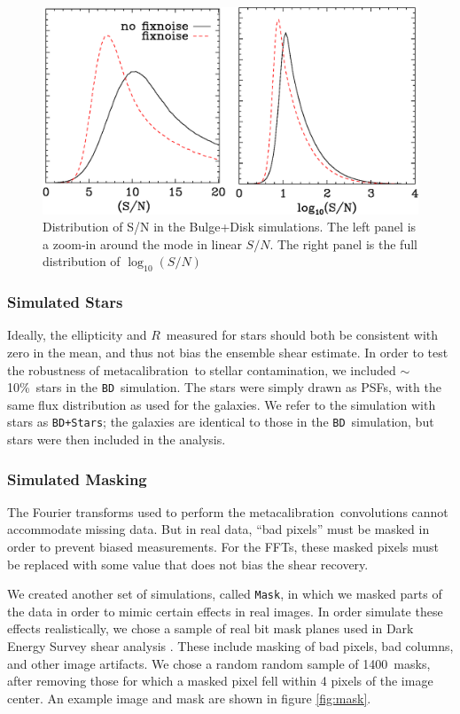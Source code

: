 \documentclass[usegraphicx,usenatbib]{mn2e}
\newcommand{\nmasks}{1400}
\newcommand{\mcal}{metacalibration}
\newcommand{\mcalR}{$R$}
\newcommand{\nsimNstarperc}{10\%}
\newcommand{\bdsim}{\texttt{BD}}
\newcommand{\bdstar}{\texttt{BD+Stars}}
\newcommand{\bdmask}{\texttt{Mask}}
\begin{document}
\begin{figure}
    \centering
    \includegraphics[scale=0.45]{s2n-bd36.eps}

    \caption{Distribution of S/N in the Bulge+Disk simulations. The
    left panel is a zoom-in around the mode in linear $S/N$.  The right panel is
the full distribution of $\log_{10}(S/N)$}

\label{fig:s2n}
\end{figure}

\subsubsection{Simulated Stars}

Ideally, the ellipticity and \mcalR\ measured for stars should both be
consistent with zero in the mean, and thus not bias the ensemble shear
estimate.  In order to test the robustness of \mcal\ to stellar contamination,
we included $\sim$\nsimNstarperc\ stars in the \bdsim\ simulation.  The stars
were simply drawn as PSFs, with the same flux distribution as used for the
galaxies.  We refer to the simulation with stars as \bdstar; the
galaxies are identical to those in the \bdsim\ simulation, but stars
were then included in the analysis.

\subsubsection{Simulated Masking}

The Fourier transforms used to perform the \mcal\ convolutions cannot
accommodate missing data.  But in real data, ``bad pixels'' must be masked in
order to prevent biased measurements. For the FFTs, these masked pixels must be
replaced with some value that does not bias the shear recovery.

We created another set of simulations, called \bdmask, in which we masked
parts of the data in order to mimic certain effects in real images.  In order
simulate these effects realistically, we chose a sample of real bit mask planes
used in Dark Energy Survey shear analysis \citep{DESSVShear}.  These include
masking of bad pixels, bad columns, and other image artifacts.   We chose a random
random sample of \nmasks\ masks, after removing those for which a masked pixel
fell within 4 pixels of the image center.  An example image and mask are shown
in figure \ref{fig:mask}.
\end{document}
